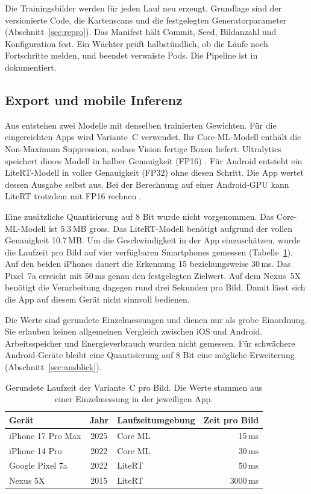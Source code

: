 Die Trainingsbilder werden für jeden Lauf neu erzeugt. Grundlage sind
der versionierte Code, die Kartenscans und die festgelegten
Generatorparameter (Abschnitt~\ref{sec:repro}). Das Manifest hält
Commit, Seed, Bildanzahl und Konfiguration fest. Ein Wächter prüft
halbstündlich, ob die Läufe noch Fortschritte melden, und beendet
verwaiste Pods. Die Pipeline ist in
 dokumentiert.

\subsection{Export und mobile Inferenz}\label{sec:app}

Aus  entstehen zwei Modelle mit denselben trainierten
Gewichten. Für die eingereichten Apps wird Variante~C verwendet.
Ihr Core-ML-Modell enthält die Non-Maximum Suppression, sodass Vision
fertige Boxen liefert. Ultralytics speichert dieses Modell in halber Genauigkeit
(FP16) \cite{ultralytics2026coreml}. Für Android entsteht ein LiteRT-Modell in voller Genauigkeit
(FP32) ohne diesen Schritt. Die App wertet dessen Ausgabe selbst
aus. Bei der Berechnung auf einer Android-GPU kann LiteRT
trotzdem mit FP16 rechnen \cite{google2026litertgpu}.

Eine zusätzliche Quantisierung auf 8 Bit wurde nicht vorgenommen.
Das Core-ML-Modell ist 5.3\,MB gross. Das LiteRT-Modell benötigt aufgrund
der vollen Genauigkeit 10.7\,MB. Um die Geschwindigkeit in der App
einzuschätzen, wurde die Laufzeit pro Bild auf vier verfügbaren
Smartphones gemessen (Tabelle~\ref{tab:geraete}). Auf den beiden iPhones
dauert die Erkennung 15 beziehungsweise 30\,ms. Das Pixel~7a erreicht mit
50\,ms genau den festgelegten Zielwert. Auf dem Nexus~5X benötigt die
Verarbeitung dagegen rund drei Sekunden pro Bild. Damit lässt sich die
App auf diesem Gerät nicht sinnvoll bedienen.

Die Werte sind gerundete Einzelmessungen und dienen nur als grobe
Einordnung. Sie erlauben keinen allgemeinen Vergleich zwischen iOS und
Android. Arbeitsspeicher und Energieverbrauch wurden nicht gemessen. Für
schwächere Android-Geräte bleibt eine Quantisierung auf 8 Bit eine
mögliche Erweiterung (Abschnitt~\ref{sec:ausblick}).

\begin{table}[H]
\centering\small
\begin{tabular}{@{}lclr@{}}
\toprule
\textbf{Gerät} & \textbf{Jahr} & \textbf{Laufzeitumgebung} & \textbf{Zeit pro Bild} \\
\midrule
iPhone 17 Pro Max & 2025 & Core ML & 15\,ms \\
iPhone 14 Pro & 2022 & Core ML & 30\,ms \\
Google Pixel 7a & 2022 & LiteRT & 50\,ms \\
Nexus 5X & 2015 & LiteRT & 3000\,ms \\
\bottomrule
\end{tabular}
\caption{Gerundete Laufzeit der Variante~C pro Bild. Die Werte stammen aus
einer Einzelmessung in der jeweiligen App.}
\label{tab:geraete}
\end{table}

